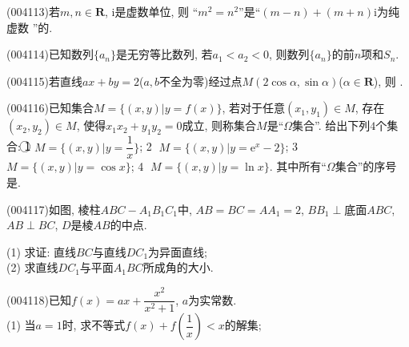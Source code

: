 \item (004113)若$m,n\in \mathbf{R}$, $\mathrm{i}$是虚数单位, 则 ``$m^2=n^2$''是``$(m-n)+(m+n)\mathrm{i}$为纯虚数 ''的.
\item (004114)已知数列$\{a_n\}$是无穷等比数列, 若$a_1<a_2<0$, 则数列$\{a_n\}$的前$n$项和$S_n$.
\item (004115)若直线$ax+by=2$($a,b$不全为零)经过点$M(2\cos \alpha ,\sin \alpha)$($\alpha \in \mathbf{R}$), 则	.
\item (004116)已知集合$M=\{(x,y)|y=f(x)\}$, 若对于任意$(x_1,y_1)\in M$, 存在$(x_2,y_2)\in M$, 使得$x_1x_2+y_1y_2=0$成立, 则称集合$M$是``$\Omega$集合''. 给出下列$4$个集合:
\textcircled{1} $M=\{(x,y) |y=\dfrac 1x \}$; \textcircled{2} $M=\{(x,y)|y=\mathrm{e}^x-2\}$; \textcircled{3} $M=\{(x,y)|y=\cos x\}$; \textcircled{4} $M=\{(x,y)|y=\ln x\}$.
其中所有``$\Omega$集合''的序号是.
\item (004117)如图, 棱柱$ABC-A_1B_1C_1$中, $AB=BC=AA_1=2$, $BB_1\perp\text{底面}ABC$, $AB\perp BC$, $D$是棱$AB$的中点.
\begin{center}
\end{center}
(1) 求证: 直线$BC$与直线$DC_1$为异面直线;\\
(2) 求直线$DC_1$与平面$A_1BC$所成角的大小.
\item (004118)已知$f(x)=ax+\dfrac{x^2}{x^2+1}$, $a$为实常数.\\
(1) 当$a=1$时, 求不等式$f(x)+f(\dfrac 1x)<x$的解集;\\
